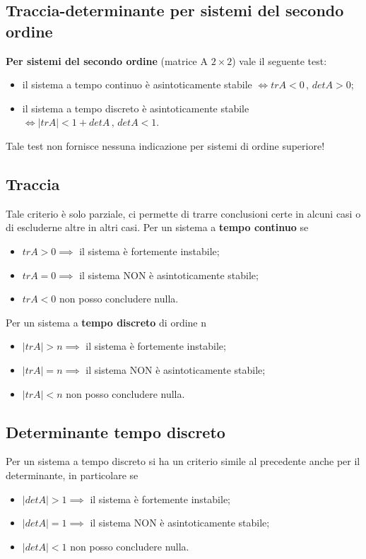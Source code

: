 \documentclass[a4paper]{article}
\begin{document}
	\subsection{Traccia-determinante per sistemi del secondo ordine}
	\textbf{Per sistemi del secondo ordine} (matrice A $2\times 2$) vale il seguente test:
	\begin{itemize}
		\item il sistema a tempo continuo è asintoticamente stabile $\Leftrightarrow trA<0\,,\,detA>0$;
		\item il sistema a tempo discreto è asintoticamente stabile $\Leftrightarrow |trA|<1+detA\,,\,detA<1$.
	\end{itemize}
	Tale test non fornisce nessuna indicazione per sistemi di ordine superiore!
	
	\subsection{Traccia}
	Tale criterio è solo parziale, ci permette di trarre conclusioni certe in alcuni casi o di escluderne altre in altri casi. 
	Per un sistema a \textbf{tempo continuo} se 
	\begin{itemize}
		\item $trA>0\implies$ il sistema è fortemente instabile;
		\item $trA=0\implies$ il sistema NON è asintoticamente stabile;
		\item $trA<0$ non posso concludere nulla.
	\end{itemize}
		Per un sistema a \textbf{tempo discreto} di ordine n 
	\begin{itemize}
		\item $|trA|>n\implies$ il sistema è fortemente instabile;
		\item $|trA|=n\implies$ il sistema NON è asintoticamente stabile;
		\item $|trA|<n$ non posso concludere nulla.
	\end{itemize}
	
	\subsection{Determinante tempo discreto}
	Per un sistema a tempo discreto si ha un criterio simile al  precedente anche per il determinante, in particolare se
	\begin{itemize}
		\item $|detA|>1\implies$ il sistema è fortemente instabile;
		\item $|detA|=1\implies$ il sistema NON è asintoticamente stabile;
		\item $|detA|<1$ non posso concludere nulla.
	\end{itemize}
	
\end{document}
